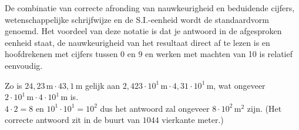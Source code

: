 \documentclass{ximera}
\begin{document}
De combinatie van correcte afronding van nauwkeurigheid en beduidende cijfers, wetenschappelijke schrijfwijze en de S.I.-eenheid wordt de standaardvorm genoemd. Het voordeel van deze notatie is dat je antwoord in de afgesproken eenheid staat, de nauwkeurigheid van het resultaat direct af te lezen is en hoofdrekenen met cijfers tussen 0 en 9 en werken met machten van 10 is relatief eenvoudig.

\begin{example}\nl
    Zo is $24{,}23 \, \mathrm{m} \cdot 43{,}1 \, \mathrm{m}$ gelijk aan $2{,}423 \cdot 10^1 \, \mathrm{m} \cdot 4{,}31 \cdot 10^1 \, \mathrm{m}$, wat ongeveer $2 \cdot 10^1 \, \mathrm{m} \cdot 4 \cdot 10^1 \, \mathrm{m}$ is.\\
    $4 \cdot 2 = 8$ en $10^{1} \cdot 10^{1} = 10^{2}$ dus het antwoord zal ongeveer $8 \cdot 10^2 \, \mathrm{m}^{2}$ zijn. (Het correcte antwoord zit in de buurt van $1044$ vierkante meter.)
\end{example}
\end{document}
